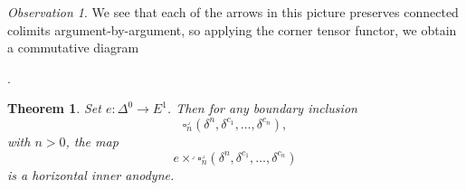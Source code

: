 \documentclass{amsart}
\numberwithin{equation}{section}
\theoremstyle{plain}   %
\newtheorem{thm}[subsection]{Theorem}
\theoremstyle{remark}
\newtheorem{obs}[subsection]{Observation}
\theoremstyle{plain}
\DeclareMathOperator{\id}{id}
\newcommand{\overcat}[2]{{\left(#1\downarrow #2\right)}}
\newcommand{\psh}[1]{\ensuremath{\widehat{#1}}}
\newcommand{\C}{\ensuremath{\mathcal{C}}}
\newcommand{\cellset}{\ensuremath{\widehat{\Theta[\mathcal{C}]}}}
\begin{document}
\begin{obs}
	We see that each of the arrows in this picture preserves connected colimits argument-by-argument, so applying the corner tensor functor, we obtain a commutative diagram
	\begin{center}
		.
	\end{center}
\end{obs}
\begin{thm}
	Set \(e:\Delta^0\to E^1\). Then for any boundary inclusion 
	\[\square_n^\lrcorner(\delta^n,\delta^{c_1},\dots,\delta^{c_n}),\]
	with \(n>0\), the map 
	\[e \times^\lrcorner \square_n^\lrcorner(\delta^n,\delta^{c_1},\dots,\delta^{c_n})\]
	is a horizontal inner anodyne.
\end{thm}
\end{document}
